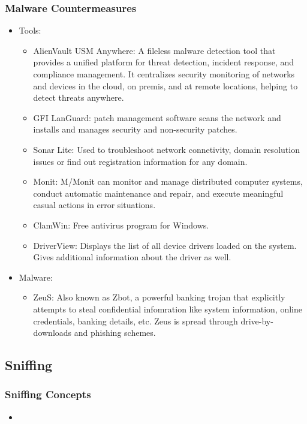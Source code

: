 \subsubsection{Malware Countermeasures}
\begin{itemize}
    \item Tools:
    \begin{itemize}
        \item AlienVault USM Anywhere: A fileless malware detection tool that provides a unified platform for threat detection, incident response, and compliance management. It centralizes security monitoring of networks and devices in the cloud, on premis, and at remote locations, helping to detect threats anywhere.
        \item GFI LanGuard: patch management software scans the network and installs and manages security and non-security patches.
        \item Sonar Lite: Used to troubleshoot network connetivity, domain resolution issues or find out registration information for any domain.
        \item Monit: M/Monit can monitor and manage distributed computer systems, conduct automatic maintenance and repair, and execute meaningful casual actions in error situations.
        \item ClamWin: Free antivirus program for Windows.
        \item DriverView: Displays the list of all device drivers loaded on the system. Gives additional information about the driver as well.
    \end{itemize}
    \item Malware:
    \begin{itemize}
        \item ZeuS: Also known as Zbot, a powerful banking trojan that explicitly attempts to steal confidential infomration like system information, online credentials, banking details, etc. Zeus is spread through drive-by-downloads and phishing schemes.
    \end{itemize}
\end{itemize}

\subsection{Sniffing}
\subsubsection{Sniffing Concepts}
\begin{itemize}
    \item 
\end{itemize}
